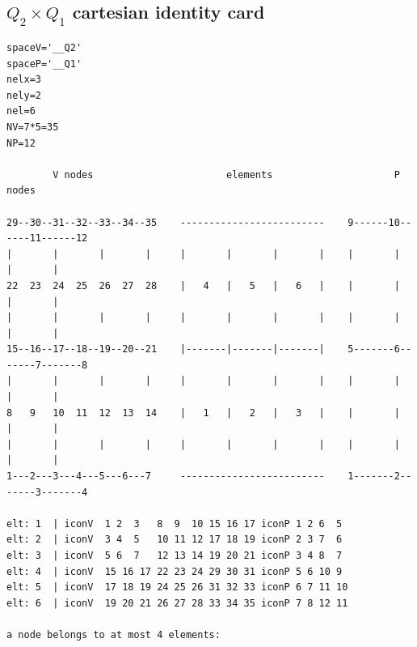 \subsection{$Q_2 \times Q_1$ cartesian identity card}
\begin{small}
\begin{verbatim}
spaceV='__Q2'
spaceP='__Q1'
nelx=3
nely=2
nel=6
NV=7*5=35
NP=12

        V nodes                       elements                     P nodes 

29--30--31--32--33--34--35    -------------------------    9------10------11------12
|       |       |       |     |       |       |       |    |       |       |       |
22  23  24  25  26  27  28    |   4   |   5   |   6   |    |       |       |       |
|       |       |       |     |       |       |       |    |       |       |       |
15--16--17--18--19--20--21    |-------|-------|-------|    5-------6-------7-------8
|       |       |       |     |       |       |       |    |       |       |       |
8   9   10  11  12  13  14    |   1   |   2   |   3   |    |       |       |       |
|       |       |       |     |       |       |       |    |       |       |       |
1---2---3---4---5---6---7     -------------------------    1-------2-------3-------4

elt: 1  | iconV  1 2  3   8  9  10 15 16 17 iconP 1 2 6  5
elt: 2  | iconV  3 4  5   10 11 12 17 18 19 iconP 2 3 7  6
elt: 3  | iconV  5 6  7   12 13 14 19 20 21 iconP 3 4 8  7
elt: 4  | iconV  15 16 17 22 23 24 29 30 31 iconP 5 6 10 9
elt: 5  | iconV  17 18 19 24 25 26 31 32 33 iconP 6 7 11 10
elt: 6  | iconV  19 20 21 26 27 28 33 34 35 iconP 7 8 12 11

a node belongs to at most 4 elements:


\end{verbatim}
\end{small}
